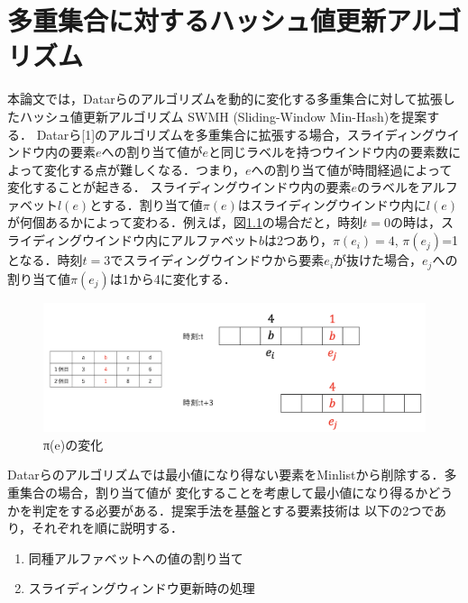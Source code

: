 \chapter{多重集合に対するハッシュ値更新アルゴリズム}
本論文では，Datarらのアルゴリズムを動的に変化する多重集合に対して拡張したハッシュ値更新アルゴリズム
SWMH (Sliding-Window Min-Hash)を提案する．
Datarら[1]のアルゴリズムを多重集合に拡張する場合，スライディングウインドウ内の要素$e$への割り当て値が$e$と同じラベルを持つウインドウ内の要素数によって変化する点が難しくなる．つまり，$e$への割り当て値が時間経過によって変化することが起きる．
スライディングウインドウ内の要素$e$のラベルをアルファベット$l(e)$とする．割り当て値$\pi(e)$はスライディングウインドウ内に$l(e)$が何個あるかによって変わる．例えば，図\ref{fig:43}の場合だと，時刻$t=0$の時は，スライディングウインドウ内にアルファベット$b$は2つあり，$\pi(e_i)=4$, $\pi(e_j)$=1となる．時刻$t=3$でスライディングウインドウから要素$e_i$が抜けた場合，$e_j$への割り当て値$\pi(e_j)$は1から4に変化する．
\begin{figure}[H]
  \centering
  \includegraphics[width=18cm]{43.png}
    \caption{π(e)の変化}
    \label{fig:43}
\end{figure}
Datarらのアルゴリズムでは最小値になり得ない要素をMinlistから削除する．多重集合の場合，割り当て値が
変化することを考慮して最小値になり得るかどうかを判定をする必要がある．提案手法を基盤とする要素技術は
以下の2つであり，それぞれを順に説明する．
\begin{enumerate}
\item 同種アルファベットへの値の割り当て
\item スライディングウィンドウ更新時の処理
\end{enumerate}
